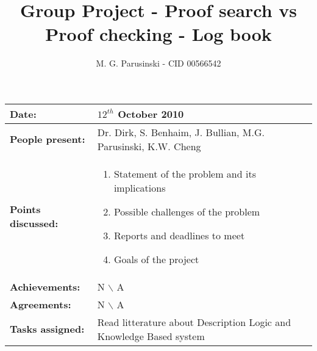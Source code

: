 \documentclass[12pt,a4paper]{article}
\title{Group Project - Proof search vs Proof checking - Log book}
\author{M. G. Parusinski - CID 00566542}
\newcommand{\meeting}[6]{%
\begin{center}%
\begin{longtable}{| p{3.5cm} | | p{13cm} |}%
\hline%
\textbf{Date:} & #1 \\%
\hline%
\textbf{People present:} &#2 \\%
\hline%
\textbf{Points discussed:} &#3\\%
\hline%
\textbf{Achievements:} &#4 \\%
\hline%
\textbf{Agreements:} &#5 \\%
\hline%
\textbf{Tasks assigned:} &#6  \\%
\hline%
\end{longtable}%
\end{center}%
\bigbreak
}
\begin{document}
\maketitle

\meeting{$12^{th}$ October 2010}%
{Dr. Dirk, S. Benhaim, J. Bullian, M.G. Parusinski, K.W. Cheng}%
{ \begin{enumerate} \item Statement of the problem and its implications 
 \item Possible challenges of the problem 
 \item Reports and deadlines to meet 
 \item Goals of the project 
\end{enumerate} }%
{ N $\backslash$ A}%
{ N $\backslash$ A}%
{ Read litterature about Description Logic and Knowledge Based system}
\end{document}
